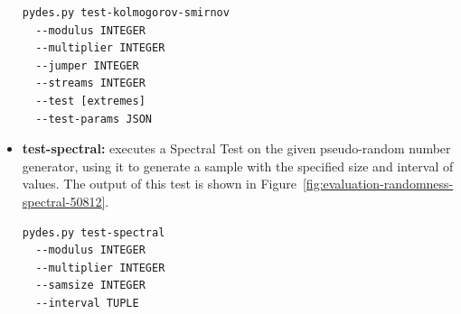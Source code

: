 \begin{itemize}
	\begin{lstlisting}[basicstyle=\tiny]
pydes.py test-kolmogorov-smirnov
  --modulus INTEGER
  --multiplier INTEGER
  --jumper INTEGER
  --streams INTEGER
  --test [extremes]
  --test-params JSON
	\end{lstlisting}
	
	\item \textbf{test-spectral:} executes a Spectral Test \cite{leemis2006discrete} on the given pseudo-random number generator, using it to generate a sample with the specified size and interval of values. The output of this test is shown in Figure~\ref{fig:evaluation-randomness-spectral-50812}.
	\begin{lstlisting}[basicstyle=\tiny]
pydes.py test-spectral
  --modulus INTEGER
  --multiplier INTEGER
  --samsize INTEGER
  --interval TUPLE
	\end{lstlisting}
	
\end{itemize}

